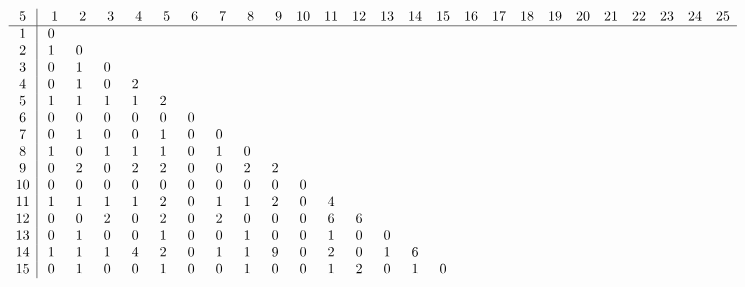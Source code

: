 \begin{landscape}
\[
\begin{array}{c|ccccccccccccccccccccccccc}\addcontentsline{lot}{table}{\protect\numberline{}Dimensions of the Kernel of $\mathcal{L}_{r,c,5}$}
 5&  \phantom{0}1&  \phantom{0}2&  \phantom{0}3&  \phantom{0}4&  \phantom{0}5&  \phantom{0}6&  \phantom{0}7&  \phantom{0}8&  \phantom{0}9& 10& 11& 12& 13& 14& 15& 16& 17& 18& 19& 20& 21& 22& 23& 24& 25\\
\hline
 1&  0&   &   &   &   &   &   &   &   &   &   &   &   &   &   &   &   &   &   &   &   &   &   &   &   \\
 2&  1&  0&   &   &   &   &   &   &   &   &   &   &   &   &   &   &   &   &   &   &   &   &   &   &   \\
 3&  0&  1&  0&   &   &   &   &   &   &   &   &   &   &   &   &   &   &   &   &   &   &   &   &   &   \\
 4&  0&  1&  0&  2&   &   &   &   &   &   &   &   &   &   &   &   &   &   &   &   &   &   &   &   &   \\
 5&  1&  1&  1&  1&  2&   &   &   &   &   &   &   &   &   &   &   &   &   &   &   &   &   &   &   &   \\
 6&  0&  0&  0&  0&  0&  0&   &   &   &   &   &   &   &   &   &   &   &   &   &   &   &   &   &   &   \\
 7&  0&  1&  0&  0&  1&  0&  0&   &   &   &   &   &   &   &   &   &   &   &   &   &   &   &   &   &   \\
 8&  1&  0&  1&  1&  1&  0&  1&  0&   &   &   &   &   &   &   &   &   &   &   &   &   &   &   &   &   \\
 9&  0&  2&  0&  2&  2&  0&  0&  2&  2&   &   &   &   &   &   &   &   &   &   &   &   &   &   &   &   \\
10&  0&  0&  0&  0&  0&  0&  0&  0&  0&  0&   &   &   &   &   &   &   &   &   &   &   &   &   &   &   \\
11&  1&  1&  1&  1&  2&  0&  1&  1&  2&  0&  4&   &   &   &   &   &   &   &   &   &   &   &   &   &   \\
12&  0&  0&  2&  0&  2&  0&  2&  0&  0&  0&  6&  6&   &   &   &   &   &   &   &   &   &   &   &   &   \\
13&  0&  1&  0&  0&  1&  0&  0&  1&  0&  0&  1&  0&  0&   &   &   &   &   &   &   &   &   &   &   &   \\
14&  1&  1&  1&  4&  2&  0&  1&  1&  9&  0&  2&  0&  1&  6&   &   &   &   &   &   &   &   &   &   &   \\
15&  0&  1&  0&  0&  1&  0&  0&  1&  0&  0&  1&  2&  0&  1&  0&   &   &   &   &   &   &   &   &   &   \\

\end{array}\]
\end{landscape}
